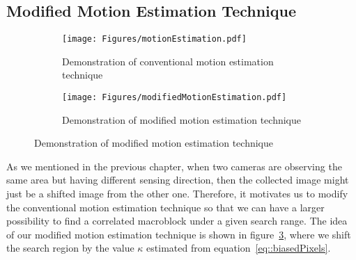 \subsection{Modified Motion Estimation Technique}
%
\begin{figure}
\begin{subfigure}[b]{\columnwidth}
\begin{center}
\texttt{[image: Figures/motionEstimation.pdf]}
\caption{\label{fig::modifiedME}Demonstration of conventional motion estimation technique}
\end{center}
\end{subfigure}
%
\begin{subfigure}[b]{\columnwidth}
\begin{center}
\texttt{[image: Figures/modifiedMotionEstimation.pdf]}
\caption{\label{fig::modifiedME}Demonstration of modified motion estimation technique}
\end{center}
\end{subfigure}
\end{figure}
As we mentioned in the previous chapter, when two cameras are observing the same area but having different sensing direction, then the collected image might just be a shifted image from the other one.
Therefore, it motivates us to modify the conventional motion estimation technique so that we can have a larger possibility to find a correlated macroblock under a given search range.
The idea of our modified motion estimation technique is shown in figure~\ref{fig::modifiedME}, where we shift the search region by the value $\kappa$ estimated from equation~\eqref{eq::biasedPixels}.